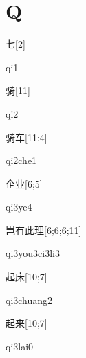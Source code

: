 ﻿%
\section*{Q}

\begin{verbete}[qi1]{七}[2]
\begin{pronuncia}{qi1}
\end{pronuncia}
\end{verbete}

\begin{verbete}[qi2]{骑}[11]
\begin{pronuncia}{qi2}
\end{pronuncia}
\end{verbete}

\begin{verbete}[qi2che1]{骑车}[11;4]
\begin{pronuncia}{qi2che1}
\end{pronuncia}
\end{verbete}

\begin{verbete}[qi3ye4]{企业}[6;5]
\begin{pronuncia}{qi3ye4}
\end{pronuncia}
\end{verbete}

\begin{verbete}[qi3you3ci3li3]{岂有此理}[6;6;6;11]
\begin{pronuncia}{qi3you3ci3li3}
\end{pronuncia}
\end{verbete}

\begin{verbete}[qi3chuang2]{起床}[10;7]
\begin{pronuncia}{qi3chuang2}
\end{pronuncia}
\end{verbete}

\begin{verbete}[qi3lai0]{起来}[10;7]
\begin{pronuncia}{qi3lai0}
\end{pronuncia}
\end{verbete}

